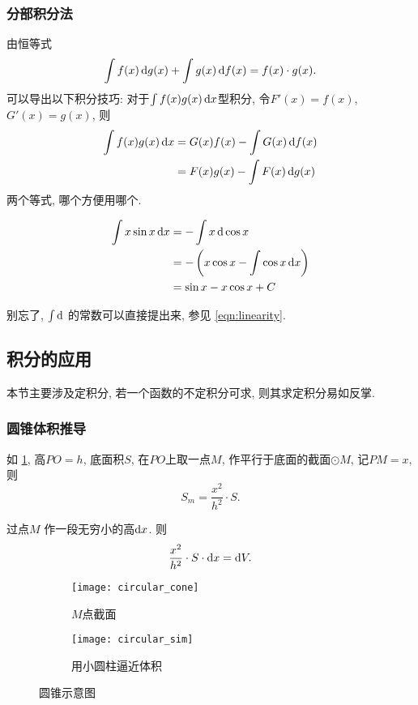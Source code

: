 \subsubsection*{分部积分法}
由恒等式
\[
  \int f(x)\mathop{}\!\mathrm{d} g(x) + \int g(x) \mathop{}\!\mathrm{d} f(x) = f(x)\cdot g(x)
.\]
可以导出以下积分技巧:
对于$\int f(x)g(x) \mathop{}\!\mathrm{d} x$型积分, 令$F'(x) = f(x)$, $G'(x) = g(x)$, 则
\begin{align*}
  \int f(x)g(x) \mathop{}\!\mathrm{d} x & = G(x)f(x) - \int G(x) \mathop{}\!\mathrm{d} f(x) \\
  & = F(x)g(x) - \int F(x) \mathop{}\!\mathrm{d} g(x)
\end{align*}
两个等式, 哪个方便用哪个.

\begin{example}
  \begin{align*}
    \int x \sin x\mathop{}\!\mathrm{d} x & = - \int x \mathop{}\!\mathrm{d} \cos x                          \\
    & = -\left(x \cos x - \int  \cos x \mathop{}\!\mathrm{d} x \right) \\
    & = \sin x - x \cos x +C
  \end{align*}
\end{example}
别忘了, $\int \mathop{}\!\mathrm{d}$  的常数可以直接提出来, 参见 \cref{eqn:linearity}.

\subsection{积分的应用}
本节主要涉及定积分, 若一个函数的不定积分可求, 则其求定积分易如反掌.

\subsubsection{圆锥体积推导}

如 \cref{fig:circular_cone}, 高$PO = h$, 底面积$S$, 在$PO$上取一点$M$,
作平行于底面的截面$\odot M$, 记$PM = x$, 则
\[
  S_m = \frac{x^{2}}{h^{2} } \cdot S
.\]

过点$M$ 作一段无穷小的高$\mathop{}\!\mathrm{d} x$.
则
\[
  \frac{x^{2}}{h^{2} }\cdot S \cdot \mathop{}\!\mathrm{d} x = \mathop{}\!\mathrm{d} V
.\]

\begin{figure}[!htbp]
  \begin{center}
    \begin{subfigure}{0.45\textwidth}
      \centering
      \texttt{[image: circular\_cone]}
      \caption{$M$点截面}\label{fig:circular_cone}
    \end{subfigure}
    \begin{subfigure}{0.45\textwidth}
      \centering
      \texttt{[image: circular\_sim]}
      \caption{用小圆柱逼近体积}\label{fig:circular_sim}
    \end{subfigure}
    \caption{圆锥示意图}
  \end{center}
\end{figure}

